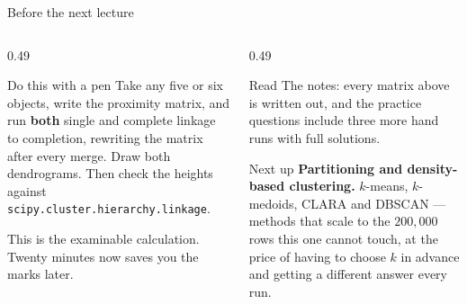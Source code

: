 \documentclass[aspectratio=169]{beamer}
\begin{document}
\begin{frame}[shrink=17]{Before the next lecture}
  \begin{columns}[T]
    \begin{column}{0.49\textwidth}
      \begin{block}{Do this with a pen}
        Take any five or six objects, write the proximity matrix, and run
        \textbf{both} single and complete linkage to completion, rewriting the
        matrix after every merge. Draw both dendrograms. Then check the
        heights against \texttt{scipy.cluster.hierarchy.linkage}.

        \medskip
        This is the examinable calculation. Twenty minutes now saves you the
        marks later.
      \end{block}
    \end{column}
    \begin{column}{0.49\textwidth}
      \begin{block}{Read}
        The notes: every matrix above is written out, and the practice
        questions include three more hand runs with full solutions.
      \end{block}
      \begin{exampleblock}{Next up}
        \textbf{Partitioning and density-based clustering.} $k$-means,
        $k$-medoids, CLARA and DBSCAN --- methods that scale to the
        $200{,}000$ rows this one cannot touch, at the price of having to
        choose $k$ in advance and getting a different answer every run.
      \end{exampleblock}
    \end{column}
  \end{columns}
  \slidesources{\AMLUnitVIISources}
\end{frame}
\end{document}
